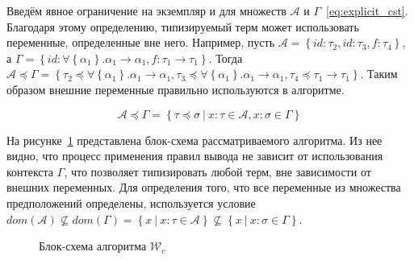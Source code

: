 Введём явное ограничение на экземпляр и для множеств $\mathcal{A}$ и $\Gamma$~\eqref{eq:explicit_cst}.
Благодаря этому определению, типизируемый терм может использовать переменные, определенные вне него.
Например, пусть $\mathcal{A} = \left\{ id: \tau_2, id: \tau_3, f: \tau_4 \right\}$, а $\Gamma = \left\{ id: \forall \left\{ \alpha_1 \right\}. \alpha_1 \to \alpha_1, f: \tau_1 \to \tau_1 \right\}$.
Тогда $\mathcal{A} \preceq \Gamma = \left\{ \tau_2 \preceq \forall \left\{ \alpha_1 \right\}. \alpha_1 \to \alpha_1, \tau_3 \preceq\forall \left\{ \alpha_1 \right\}. \alpha_1 \to \alpha_1, \tau_4 \preceq \tau_1 \to \tau_1 \right\}$.
Таким образом внешние переменные правильно используются в алгоритме.

\begin{equation}
    \label{eq:explicit_cst}
    \mathcal{A} \preceq \Gamma = \left\{ \tau \preceq \sigma ~|~ x: \tau \in \mathcal{A}, x: \sigma \in \Gamma \right\}
\end{equation}

На рисунке~\ref{fig:infer_algo} представлена блок-схема рассматриваемого алгоритма.
Из нее видно, что процесс применения правил вывода не зависит от использования контекста $\Gamma$, что позволяет типизировать любой терм, вне зависимости от внешних переменных.
Для определения того, что все переменные из множества предположений определены, используется условие $dom(\mathcal{A}) \nsubseteq dom(\Gamma) = \left\{ x ~|~ x: \tau \in \mathcal{A} \right\} \nsubseteq \left\{ x ~|~ x: \sigma \in \Gamma \right\}$.

\begin{figure}[H]
    \centering
    
    \caption{Блок-схема алгоритма $\mathcal{W}_c$}
    \label{fig:infer_algo}
\end{figure}


